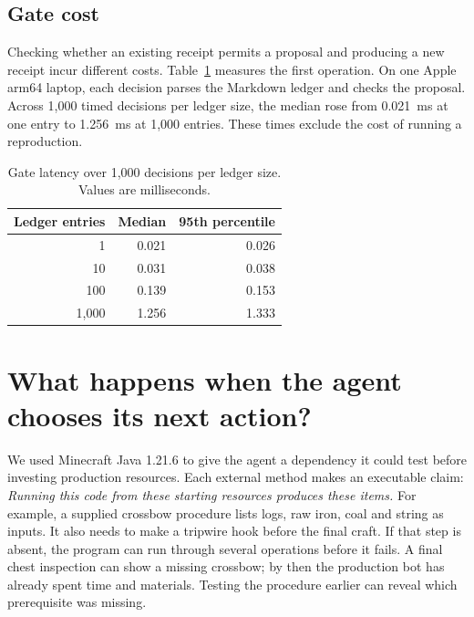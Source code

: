 \documentclass{article}
\begin{document}
\subsection{Gate cost}

Checking whether an existing receipt permits a proposal and producing a new receipt incur different costs. Table~\ref{tab:latency} measures the first operation. On one Apple arm64 laptop, each decision parses the Markdown ledger and checks the proposal. Across 1,000 timed decisions per ledger size, the median rose from 0.021~ms at one entry to 1.256~ms at 1,000 entries. These times exclude the cost of running a reproduction.

\begin{table}[t]
  \caption{Gate latency over 1,000 decisions per ledger size. Values are milliseconds.}
  \label{tab:latency}
  \centering
  \small
  \begin{tabular}{rrr}
    \toprule
    Ledger entries & Median & 95th percentile \\
    \midrule
    1 & 0.021 & 0.026 \\
    10 & 0.031 & 0.038 \\
    100 & 0.139 & 0.153 \\
    1,000 & 1.256 & 1.333 \\
    \bottomrule
  \end{tabular}
\end{table}

\section{What happens when the agent chooses its next action?}

We used Minecraft Java 1.21.6 to give the agent a dependency it could test before investing production resources. Each external method makes an executable claim: \emph{Running this code from these starting resources produces these items.} For example, a supplied crossbow procedure lists logs, raw iron, coal and string as inputs. It also needs to make a tripwire hook before the final craft. If that step is absent, the program can run through several operations before it fails. A final chest inspection can show a missing crossbow; by then the production bot has already spent time and materials. Testing the procedure earlier can reveal which prerequisite was missing.
\end{document}
